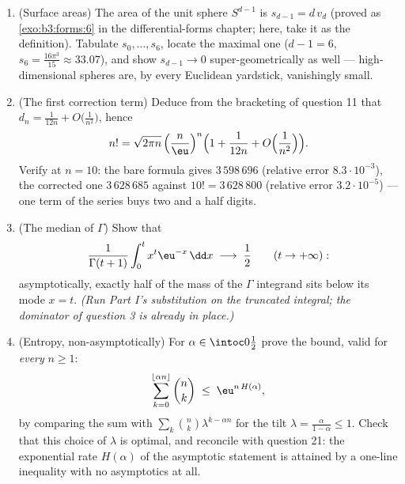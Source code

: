 \begin{problem}
\begin{enumerate}[resume]
  \item (Surface areas) The area of the unit sphere $S^{d-1}$
        is $s_{d-1} = d\,v_d$ (proved as
        \cref{exo:b3:forms:6} in the differential-forms
        chapter; here, take it as the definition). Tabulate
        $s_0, \dots, s_6$, locate the maximal one ($d - 1 =
        6$, $s_6 = \frac{16\pi^3}{15} \approx 33.07$), and
        show $s_{d-1} \to 0$ super-geometrically as well ---
        high-dimensional spheres are, by every Euclidean
        yardstick, vanishingly small.
  \item (The first correction term) Deduce from the
        bracketing of question 11 that $d_n = \frac1{12n} +
        O\bigl(\frac1{n^2}\bigr)$, hence
        \[
        n! = \sqrt{2\pi n}\,\Bigl(\frac
        n\eu\Bigr)^{n}\Bigl(1 + \frac1{12n} +
        O\Bigl(\frac1{n^2}\Bigr)\Bigr).
        \]
        Verify at $n = 10$: the bare formula gives
        $3\,598\,696$ (relative error $8.3\cdot10^{-3}$),
        the corrected one $3\,628\,685$ against $10! =
        3\,628\,800$ (relative error $3.2\cdot10^{-5}$) ---
        one term of the series buys two and a half digits.
  \item (The median of $\Gamma$) Show that
        \[
        \frac{1}{\Gamma(t+1)}
        \int_0^{t} x^{t}\eu^{-x}\,\dd x
        \;\longrightarrow\; \frac12
        \qquad (t \to +\infty) :
        \]
        asymptotically, exactly half of the mass of the
        $\Gamma$ integrand sits below its mode $x = t$.
        \emph{(Run Part I's substitution on the truncated
        integral; the dominator of question 3 is already in
        place.)}
  \item (Entropy, non-asymptotically) For $\alpha \in
        \intoc0{\frac12}$ prove the bound, valid for
        \emph{every} $n \geq 1$:
        \[
        \sum_{k=0}^{\lfloor\alpha n\rfloor}\binom nk
        \;\leq\; \eu^{n\,H(\alpha)} ,
        \]
        by comparing the sum with $\sum_k\binom
        nk\lambda^{k-\alpha n}$ for the tilt $\lambda =
        \frac{\alpha}{1-\alpha} \leq 1$. Check that this
        choice of $\lambda$ is optimal, and reconcile with
        question 21: the exponential rate $H(\alpha)$ of the
        asymptotic statement is attained by a one-line
        inequality with no asymptotics at all.
\end{enumerate}
\end{problem}
